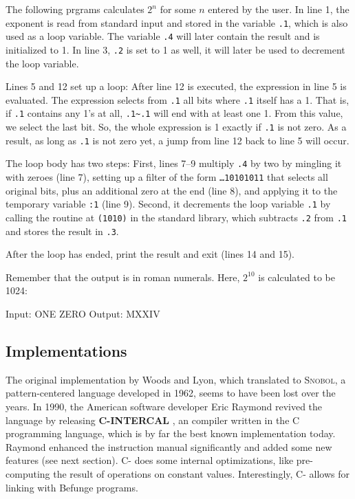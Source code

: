 The following prgrams calculates $2^n$ for some $n$ entered by the user. In line 1, the exponent is read from standard input and stored in the variable \texttt{.1}, which is also used as a loop variable. The variable \texttt{.4} will later contain the result and is initialized to 1. In line 3, \texttt{.2} is set to 1 as well, it will later be used to decrement the loop variable.

Lines 5 and 12 set up a loop: After line 12 is executed, the expression in line 5 is evaluated. The expression selects from \texttt{.1} all bits where \texttt{.1} itself has a 1. That is, if \texttt{.1} contains any 1's at all, \texttt{.1\~{}.1} will end with at least one 1. From this value, we select the last bit. So, the whole expression is 1 exactly if \texttt{.1} is not zero. As a result, as long as \texttt{.1} is not zero yet, a jump from line 12 back to line 5 will occur.

The loop body has two steps: First, lines 7--9 multiply \texttt{.4} by two by mingling it with zeroes (line 7), setting up a filter of the form \texttt{\dots10101011} that selects all original bits, plus an additional zero at the end (line 8), and applying it to the temporary variable \texttt{:1} (line 9). Second, it decrements the loop variable \texttt{.1} by calling the routine at \texttt{(1010)} in the standard library, which subtracts \texttt{.2} from \texttt{.1} and stores the result in \texttt{.3}.

After the loop has ended, print the result and exit (lines 14 and 15).



Remember that the output is in roman numerals. Here, $2^{10}$ is calculated to be 1024:

\begin{io}
Input: ONE ZERO
Output: MXXIV
\end{io}

\subsection{Implementations}

The original implementation by Woods and Lyon, which translated \ic{} to \textsc{Snobol}, a pattern-centered language developed in 1962, seems to have been lost over the years. In 1990, the American software developer Eric Raymond revived the language by releasing \textbf{C-INTERCAL} \cite{raymond_intercal}, an \ic{} compiler written in the C programming language, which is by far the best known implementation today. Raymond enhanced the instruction manual \cite{raymond2010cintercal} significantly and added some new features (see next section). C-\ic{} does some internal optimizations, like pre-computing the result of operations on constant values. Interestingly, C-\ic{} allows for linking with Befunge programs.

